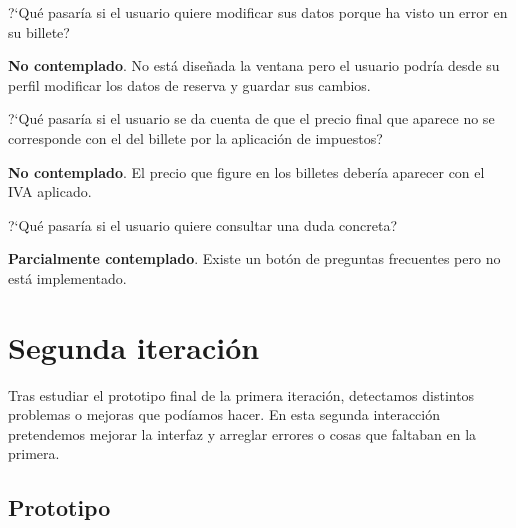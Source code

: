 \begin{escenario} %
      \centering
      ?`Qué pasaría si el usuario quiere modificar sus datos porque ha visto un error en su billete?

      \begin{solucion} \centering
            \textbf{No contemplado}.  No está diseñada la ventana pero el usuario podría desde su perfil modificar los datos de reserva y guardar sus cambios.
      \end{solucion}
\end{escenario}

\begin{escenario} %
      \centering
      ?`Qué pasaría si el usuario se da cuenta de que el precio final que aparece no se corresponde con el del billete por la aplicación de impuestos?

      \begin{solucion} \centering
            \textbf{No contemplado}. El precio que figure en los billetes debería aparecer con el IVA aplicado.

      \end{solucion}
\end{escenario}

\begin{escenario} %
      \centering
      ?`Qué pasaría si el usuario quiere consultar una duda concreta?

      \begin{solucion}
            \centering
            \textbf{Parcialmente contemplado}. Existe un botón de preguntas frecuentes pero no está implementado.
      \end{solucion}
\end{escenario}

\section{Segunda iteración}

Tras estudiar el prototipo final de la primera iteración, detectamos distintos
problemas o mejoras que podíamos hacer. En esta segunda interacción pretendemos
mejorar la interfaz y arreglar errores o cosas que faltaban en la primera.

\subsection{Prototipo}

